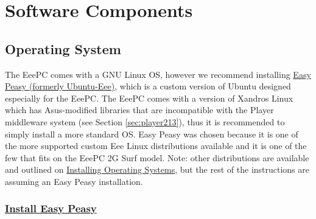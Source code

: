\section{Software Components}

\subsection{Operating System}
\label{sec:2_operating_system}

The EeePC comes with a GNU Linux OS, however we recommend installing \href{http://www.geteasypeasy.com/}{Easy Peasy (formerly Ubuntu-Eee)}, which is a custom version of Ubuntu designed especially for the EeePC.  The EeePC comes with a version of Xandros Linux which has Asus-modified libraries that are incompatible with the Player middleware system (see Section \ref{sec:player213}), thus it is recommended to simply install a more standard OS.  Easy Peasy was chosen because it is one of the more supported custom Eee Linux distributions available and it is one of the few that fits on the EeePC 2G Surf model. Note: other distributions are available and outlined on \href{http://wiki.eeeuser.com/#installing\_operating\_systems}{Installing Operating Systems}, but the rest of the instructions are assuming an Easy Peasy installation.

\subsubsection{\href{http://robotics.cs.brown.edu/projects/player_icreate/u_install.html}{Install Easy Peasy}}

